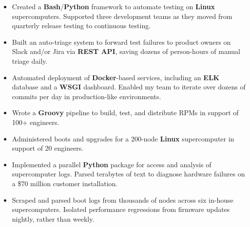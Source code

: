 \documentclass[12pt,letterpaper]{article}
\begin{document}
\begin{itemize}
    \item Created a \textbf{Bash}/\textbf{Python} framework to automate testing on \textbf{Linux} supercomputers. Supported three development teams as they moved from quarterly release testing to continuous testing.
    \item Built an auto-triage system to forward test failures to product owners on Slack and/or Jira via \textbf{REST API}, saving dozens of person-hours of manual triage daily.
    \item Automated deployment of \textbf{Docker}-based services, including an \textbf{ELK} database and a \textbf{WSGI} dashboard. Enabled my team to iterate over dozens of commits per day in production-like environments.
    \item Wrote a \textbf{Groovy} pipeline to build, test, and distribute RPMs in support of 100+ engineers.
    \item Administered boots and upgrades for a 200-node \textbf{Linux} supercomputer in support of 20 engineers.
    \item Implemented a parallel \textbf{Python} package for access and analysis of supercomputer logs. Parsed terabytes of text to diagnose hardware failures on a \$70 million customer installation.
    \item Scraped and parsed boot logs from thousands of nodes across six in-house supercomputers. Isolated performance regressions from firmware updates nightly, rather than weekly.


\end{itemize}
\end{document}
